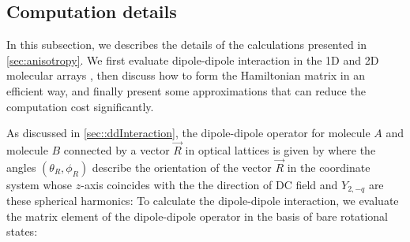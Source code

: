 \subsection{Computation details}
\label{sec:numerical}

In this subsection, we describes the details of the calculations presented in \autoref{sec:anisotropy}. We first 
evaluate dipole-dipole interaction in the 1D and 2D molecular arrays , then discuss how to form the Hamiltonian
matrix in an efficient way, and finally present some approximations that can reduce the computation cost 
significantly. 

As discussed in \autoref{sec::ddInteraction}, the dipole-dipole operator for molecule $A$ and molecule $B$ 
connected by a vector
$\vec{R}$ in optical lattices is given by
where the angles $(\theta_{R}, \phi_{R})$ describe the orientation of the vector  $\vec{R}$ in the coordinate
 system whose $z$-axis coincides with the the direction of DC field and $Y_{2, -q}$ are these spherical harmonics:
To calculate the dipole-dipole interaction, we evaluate the matrix element of the dipole-dipole operator in the basis
of bare rotational states:

